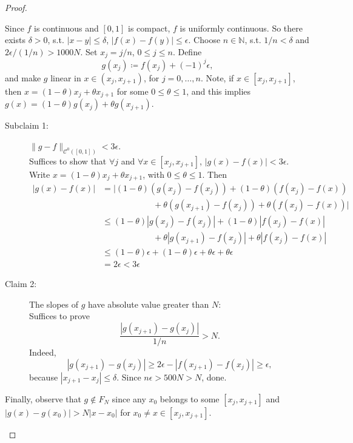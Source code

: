 \documentclass[12pt]{article}
\theoremstyle{plain}
\theoremstyle{definition}
\begin{document}
\begin{proof}
\begin{description}
            Since $f$ is continuous and $[0,1]$ is compact, $f$ is uniformly
            continuous. So there exists $\delta>0$, s.t. $|x-y|\leq\delta$,
            $|f(x)-f(y)|\leq\epsilon$.
            Choose $n\in\mathbb{N}$, s.t. $1/n<\delta$ and
            $2\epsilon/(1/n)>1000N$.
            Set $x_j=j/n$, $0\leq j\leq n$.
            Define $$g(x_j)\coloneqq f(x_j)+(-1)^j\epsilon,$$
            and make $g$ linear in $x\in(x_j,x_{j+1})$, for $j=0,\ldots,n$.
            Note, if $x\in[x_j,x_{j+1}]$, then $x=(1-\theta)x_j+\theta x_{j+1}$
            for some $0\leq\theta\leq1$, and this implies
                $g(x)=(1-\theta)g(x_j)+\theta g(x_{j+1})$.
            \begin{description}
                \item[Subclaim 1:]
                $\|g-f\|_{\mathcal{C}^0([0,1])}<3\epsilon$.\\
                Suffices to show that $\forall j$ and $\forall x\in[x_j,x_{j+1}]$,
                $|g(x)-f(x)|<3\epsilon$.
                Write $x=(1-\theta)x_j+\theta x_{j+1}$, with $0\leq\theta\leq
                1$.
                Then
                $$\begin{aligned}
                |g(x)-f(x)|&=|(1-\theta)(g(x_j)-f(x_j))+(1-\theta)(f(x_j)-f(x))\\
                &\qquad\qquad\qquad+\theta(g(x_{j+1})-f(x_j))+\theta(f(x_j)-f(x))|\\
                &\leq
                (1-\theta)|g(x_j)-f(x_j)|+(1-\theta)|f(x_j)-f(x)|\\
                &\qquad\qquad\qquad+\theta|g(x_{j+1})-f(x_j)|+\theta|f(x_j)-f(x)|\\
                &\leq
                (1-\theta)\epsilon+(1-\theta)\epsilon+\theta\epsilon+\theta\epsilon\\
                &=2\epsilon<3\epsilon
                \end{aligned}$$
                \item[Claim 2:]
                The slopes of $g$ have absolute value greater than $N$:\\
                Suffices to prove $$\frac{|g(x_{j+1})-g(x_j)|}{1/n}>N.$$
                Indeed,
                $$|g(x_{j+1})-g(x_j)|\geq2\epsilon-|f(x_{j+1})-f(x_j)|\geq
                \epsilon,$$
                because $|x_{j+1}-x_j|\leq\delta$.
                Since $n\epsilon>500N>N$, done.
            \end{description}
            Finally, observe that $g\notin F_N$ since any $x_0$ belongs to some
            $[x_j,x_{j+1}]$ and $|g(x)-g(x_0)|>N|x-x_0|$ for $x_0\neq
            x\in[x_j,x_{j+1}]$.
    \end{description}
\end{proof}
\end{document}
